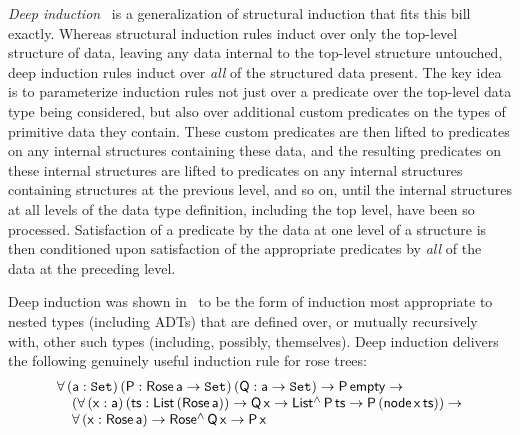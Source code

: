 \documentclass[9pt]{entcs}
\newcommand{\set}{\mathtt{Set}}
\begin{document}
{\em Deep induction}~\cite{jp20} is a generalization of structural
induction that fits this bill exactly. Whereas structural induction
rules induct over only the top-level structure of data, leaving any
data internal to the top-level structure untouched, deep induction
rules induct over {\em all} of the structured data present. The key
idea is to parameterize induction rules not just over a predicate over
the top-level data type being considered, but also over additional
custom predicates on the types of primitive data they contain. These
custom predicates are then lifted to predicates on any internal
structures containing these data, and the resulting predicates on
these internal structures are lifted to predicates on any internal
structures containing structures at the previous level, and so on,
until the internal structures at all levels of the data type
definition, including the top level, have been so
processed. Satisfaction of a predicate by the data at one level of a
structure is then conditioned upon satisfaction of the appropriate
predicates by {\em all} of the data at the preceding level.

Deep induction was shown in~\cite{jp20} to be the form of induction
most appropriate to nested types (including ADTs) that are defined
over, or mutually recursively with, other such types (including,
possibly, themselves). Deep induction delivers the following genuinely
useful induction rule for rose trees:
\begin{equation}\label{eq:rose}
\begin{array}{l}
\mathsf{\forall \,(a : \set)\,(P : Rose\,a \to \set)\,(Q : a \to \set)
  \to P\,empty \to}\\ 
\mathsf{\hspace*{0.15in}(\forall \,(x : a)\, (ts :
  List\,(Rose\,a))\to Q\,x \to List^\land\,P\,ts \to P\,(node\,x\,ts)) \to}\\
\mathsf{\hspace*{0.15in}\forall \,(x :
  Rose\,a) \to Rose^\land\,Q\, x \to P\,x} 
\end{array}
\end{equation}
\end{document}
